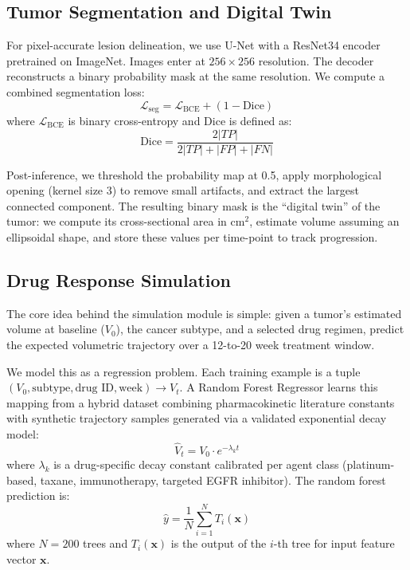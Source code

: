 \documentclass[conference]{IEEEtran}
\begin{document}
\subsection{Tumor Segmentation and Digital Twin}

For pixel-accurate lesion delineation, we use U-Net \cite{ronneberger2015} with a ResNet34 encoder pretrained on ImageNet. Images enter at $256 \times 256$ resolution. The decoder reconstructs a binary probability mask at the same resolution. We compute a combined segmentation loss:
\begin{equation}
    \mathcal{L}_{\text{seg}} = \mathcal{L}_{\text{BCE}} + (1 - \text{Dice})
    \label{eq:segloss}
\end{equation}
where $\mathcal{L}_{\text{BCE}}$ is binary cross-entropy and Dice is defined as:
\begin{equation}
    \text{Dice} = \frac{2|TP|}{2|TP| + |FP| + |FN|}
    \label{eq:dice}
\end{equation}

Post-inference, we threshold the probability map at 0.5, apply morphological opening (kernel size 3) to remove small artifacts, and extract the largest connected component. The resulting binary mask is the ``digital twin'' of the tumor: we compute its cross-sectional area in $\text{cm}^2$, estimate volume assuming an ellipsoidal shape, and store these values per time-point to track progression.

\subsection{Drug Response Simulation}

The core idea behind the simulation module is simple: given a tumor's estimated volume at baseline ($V_0$), the cancer subtype, and a selected drug regimen, predict the expected volumetric trajectory over a 12-to-20 week treatment window.

We model this as a regression problem. Each training example is a tuple $(V_0, \text{subtype}, \text{drug ID}, \text{week}) \rightarrow V_t$. A Random Forest Regressor \cite{breiman2001} learns this mapping from a hybrid dataset combining pharmacokinetic literature constants with synthetic trajectory samples generated via a validated exponential decay model:
\begin{equation}
    \hat{V}_t = V_0 \cdot e^{-\lambda_k t}
    \label{eq:decay}
\end{equation}
where $\lambda_k$ is a drug-specific decay constant calibrated per agent class (platinum-based, taxane, immunotherapy, targeted EGFR inhibitor). The random forest prediction is:
\begin{equation}
    \hat{y} = \frac{1}{N}\sum_{i=1}^{N} T_i(\mathbf{x})
    \label{eq:rf}
\end{equation}
where $N = 200$ trees and $T_i(\mathbf{x})$ is the output of the $i$-th tree for input feature vector $\mathbf{x}$.
\end{document}
